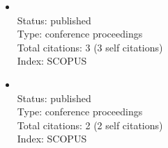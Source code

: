 \begin{itemize}
		\item{}\vspace{2mm}\\Status: published\\Type: conference proceedings\\Total citations: 3 (3 self citations)\\Index: SCOPUS
		\item{}\vspace{2mm}\\Status: published\\Type: conference proceedings\\Total citations: 2 (2 self citations)\\Index: SCOPUS
\end{itemize}
